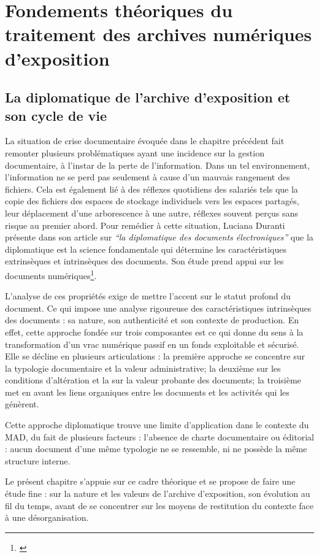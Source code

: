\part{Fondements théoriques du traitement des archives numériques d’exposition}

\chapter{La diplomatique de l'archive d'exposition et son cycle de vie}

La situation de crise documentaire évoquée dans le chapitre précédent fait remonter plusieurs problématiques ayant une incidence sur la gestion documentaire, à l'instar de la perte de l'information. Dans un tel environnement, l'information ne se perd pas seulement à cause d'un mauvais rangement des fichiers. Cela est également lié à des réflexes quotidiens des salariés tels que la copie des fichiers des espaces de stockage individuels vers les espaces partagés, leur déplacement d'une arborescence à une autre,  réflexes souvent perçus sans risque au premier abord. Pour remédier à cette situation, Luciana Duranti présente dans son article sur \textit{\enquote{la diplomatique des documents électroniques}} que la diplomatique est la science fondamentale qui détermine les caractéristiques extrinsèques  et intrinsèques des documents. Son étude prend appui sur les documents numériques\footnote{\cite{duranti-2003}}.

L'analyse de ces propriétés exige de mettre l'accent sur le statut profond du document. Ce qui impose une analyse rigoureuse des caractéristiques intrinsèques des documents :  sa nature, son authenticité et son contexte de production. En effet, cette approche fondée sur trois composantes est ce qui donne du sens à la transformation d'un vrac numérique passif en un fonds exploitable et sécurisé. Elle se décline en plusieurs articulations : la première approche se concentre sur la typologie documentaire et la valeur administrative; la deuxième sur les conditions d'altération et la sur la valeur probante des documents; la troisième met en avant les liens organiques entre les documents et les activités qui les génèrent. 

Cette approche diplomatique trouve une limite d'application dans le contexte du MAD, du fait de plusieurs facteurs : l'absence de charte documentaire ou éditorial :  aucun document d'une même typologie ne se ressemble, ni ne possède la même structure interne.

Le présent chapitre s’appuie sur ce cadre théorique et se propose de faire une étude fine : sur la nature et les valeurs de l'archive d'exposition, son évolution au fil du temps, avant de se concentrer sur les moyens de restitution du contexte face à une désorganisation.


